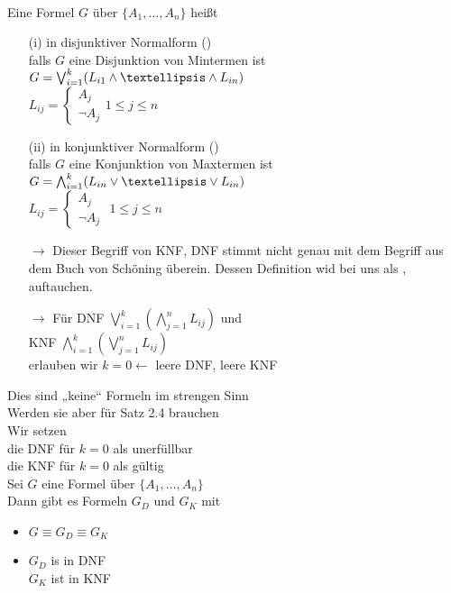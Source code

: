 \\
Eine Formel $G$ über $\{A_1, …, A_n\}$ heißt
\begin{enumerate}
\item[(i)] in disjunktiver Normalform ()\\
falls $G$ eine Disjunktion von Mintermen ist\\
$G = \bigvee_{i=1}^k (L_{i1} \AND … \AND L_{in})$\\
$L_{ij} = \begin{cases} A_j \\ \neg A_j \end{cases} 1 \leq j \leq n$\\

\item[(ii)] in konjunktiver Normalform ()\\
falls $G$ eine Konjunktion von Maxtermen ist\\
$G = \bigwedge_{i=1}^k (L_{in} \OR … \OR L_{in})$\\
$L_{ij} = \begin{cases} A_j \\ \neg A_j \end{cases}$ $1 \leq j \leq n$
\end{enumerate}

\bemerkung{}
\begin{itemize}
\item[$\rightarrow$] Dieser Begriff von KNF, DNF stimmt nicht genau mit dem Begriff aus dem Buch von Schöning überein. Dessen Definition wid bei uns als ,  auftauchen.
\item[$\rightarrow$] Für DNF $\bigvee_{i=1}^k ( \bigwedge_{j=1}^n L_{ij} )$ und \\
KNF $\bigwedge_{i=1}^k ( \bigvee_{j=1}^n L_{ij})$\\
erlauben wir $k=0 \leftarrow$ leere DNF, leere KNF
\end{itemize}
\noindent
Dies sind „keine“ Formeln im strengen Sinn\\
Werden sie aber für Satz 2.4 brauchen\\
Wir setzen\\
die DNF für $k=0$ als unerfüllbar\\
die KNF für $k=0$ als gültig\\

Sei $G$ eine Formel über $\{ A_1, …, A_n\}$\\
Dann gibt es Formeln $G_D$ und $G_K$ mit
\begin{itemize}
\item $G \equiv G_D \equiv G_K$
\item $G_D$ is in DNF\\
$G_K$ ist in KNF
\end{itemize}


